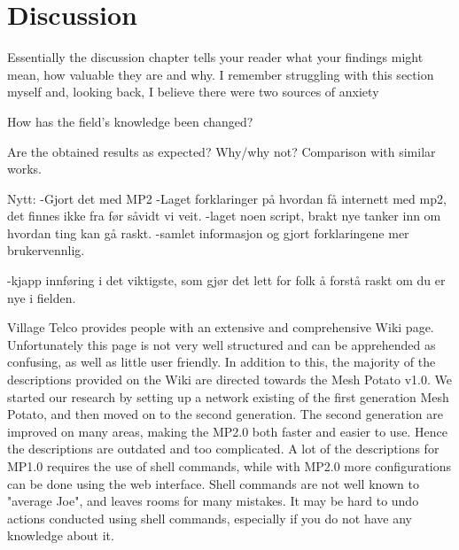 \chapter{Discussion}
\label{chp:discussion} 

Essentially the discussion chapter tells your reader what your findings might mean, how valuable they are and why. I remember struggling with this section myself and, looking back, I believe there were two sources of anxiety

How has the field's knowledge been changed?

Are the obtained results as expected? Why/why not?
Comparison with similar works. 

Nytt:
-Gjort det med MP2
-Laget forklaringer på hvordan få internett med mp2, det finnes ikke fra før såvidt vi veit. 
-laget noen script, brakt nye tanker inn om hvordan ting kan gå raskt. 
-samlet informasjon og gjort forklaringene mer brukervennlig.

-kjapp innføring i det viktigste, som gjør det lett for folk å forstå raskt om du er nye i fielden. 

Village Telco provides people with an extensive and comprehensive Wiki page. Unfortunately this page is not very well structured and can be apprehended as confusing, as well as little user friendly. In addition to this, the majority of the descriptions provided on the Wiki are directed towards the Mesh Potato v1.0. We started our research by setting up a network existing of the first generation Mesh Potato, and then moved on to the second generation. The second generation are improved on many areas, making the MP2.0 both faster and easier to use. Hence the descriptions are outdated and too complicated. A lot of the descriptions for MP1.0 requires the use of shell commands, while with MP2.0 more configurations can be done using the web interface. Shell commands are not well known to "average Joe", and leaves rooms for many mistakes. It may be hard to undo actions conducted using shell commands, especially if you do not have any knowledge about it. 



